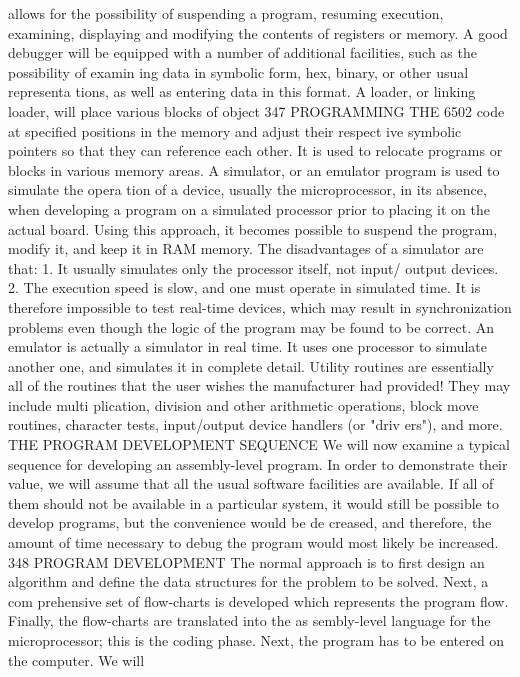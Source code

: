 {{{{{{{{{{{{{{{{{{{{{{{{{{{{{{{{{{{{{{{{{{{{{{{{{{{{{{{{{{{{{{{{{{{{{{{{{{{{{{{{{{{{{{{{{{{{{{{{{{{{{{{{{{{{{{{{{{{{{{{{{{{{{{{{{{{{{{{{{{{{allows for the possibility of suspending a program, resuming
execution, examining, displaying and modifying the contents of
registers or memory. A good debugger will be equipped with a
number of additional facilities, such as the possibility of examin
ing data in symbolic form, hex, binary, or other usual representa
tions, as well as entering data in this format.
A loader, or linking loader, will place various blocks of object
347
PROGRAMMING THE 6502
code at specified positions in the memory and adjust their respect
ive symbolic pointers so that they can reference each other. It is
used to relocate programs or blocks in various memory areas.
A simulator, or an emulator program is used to simulate the opera
tion of a device, usually the microprocessor, in its absence, when
developing a program on a simulated processor prior to placing it
on the actual board. Using this approach, it becomes possible to suspend
the program, modify it, and keep it in RAM memory. The disadvantages
of a simulator are that:
1. It usually simulates only the processor itself, not input/
output devices.
2. The execution speed is slow, and one must operate in simulated
time. It is therefore impossible to test real-time devices, which may
result in synchronization problems even though the logic of the
program may be found to be correct.
An emulator is actually a simulator in real time. It uses one
processor to simulate another one, and simulates it in complete
detail.
Utility routines are essentially all of the routines that the user
wishes the manufacturer had provided! They may include multi
plication, division and other arithmetic operations, block move
routines, character tests, input/output device handlers (or "driv
ers"), and more.
THE PROGRAM DEVELOPMENT SEQUENCE
We will now examine a typical sequence for developing an
assembly-level program. In order to demonstrate their value, we will
assume that all the usual software facilities are available. If all of
them should not be available in a particular system, it would still be
possible to develop programs, but the convenience would be de
creased, and therefore, the amount of time necessary to debug the
program would most likely be increased.
348
PROGRAM DEVELOPMENT
The normal approach is to first design an algorithm and define
the data structures for the problem to be solved. Next, a com
prehensive set of flow-charts is developed which represents the
program flow. Finally, the flow-charts are translated into the as
sembly-level language for the microprocessor; this is the coding
phase.
Next, the program has to be entered on the computer. We will
}}}}}}}}}}}}}}}}}}}}}}}}}}}}}}}}}}}}}}}}}}}}}}}}}}}}}}}}}}}}}}}}}}}}}}}}}}}}}}}}}}}}}}}}}}}}}}}}}}}}}}}}}}}}}}}}}}}}}}}}}}}}}}}}}}}}}}}}}}}}
